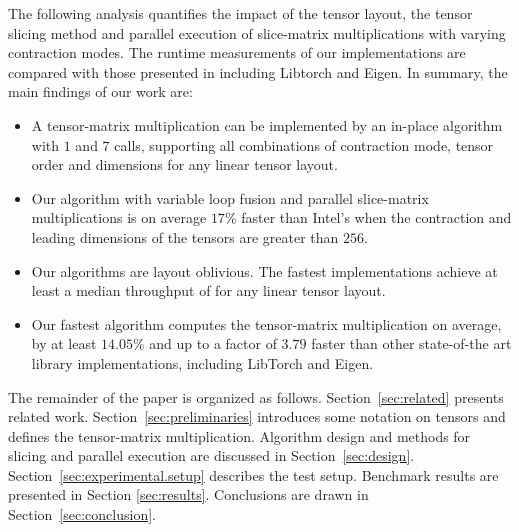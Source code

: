 The following analysis quantifies the impact of the tensor layout, the tensor slicing method and parallel execution of slice-matrix multiplications with varying contraction modes.
The runtime measurements of our implementations are compared with those presented in \cite{springer:2018:design, matthews:2018:high} including Libtorch and Eigen.
In summary, the main findings of our work are:
\begin{itemize}
	\item 
	A tensor-matrix multiplication can be implemented by an in-place algorithm with $1$  and $7$  calls, supporting all combinations of contraction mode, tensor order and dimensions for any linear tensor layout.
	\item 
	Our algorithm with variable loop fusion and parallel slice-matrix multiplications is on average $17$\% faster than Intel's  when the contraction and leading dimensions of the tensors are greater than $256$.
	\item 
	Our algorithms are layout oblivious.
	The fastest implementations achieve at least a median throughput of \tq for any linear tensor layout.
	\item
	Our fastest algorithm computes the tensor-matrix multiplication on average, by at least $14.05$\% and up to a factor of $3.79$ faster than other state-of-the art library implementations, including LibTorch and Eigen.
\end{itemize}

The remainder of the paper is organized as follows. 
Section~\ref{sec:related} presents related work.
Section~\ref{sec:preliminaries} introduces some notation on tensors and defines the tensor-matrix multiplication.
Algorithm design and methods for slicing and parallel execution are discussed in Section~\ref{sec:design}.
Section~\ref{sec:experimental.setup} describes the test setup. Benchmark results are presented in Section \ref{sec:results}.
Conclusions are drawn in Section~\ref{sec:conclusion}.